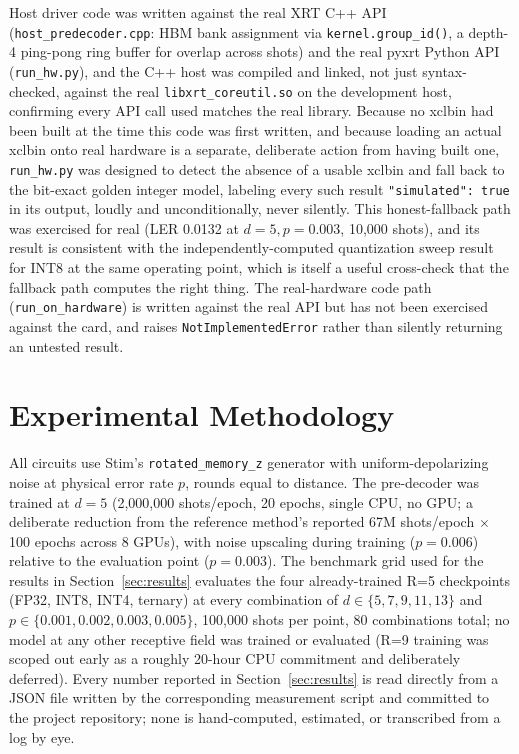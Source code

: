 \documentclass[conference]{IEEEtran}
\begin{document}
Host driver code was written against the real XRT C++ API (\texttt{host\_predecoder.cpp}: HBM bank assignment via \texttt{kernel.group\_id()}, a depth-4 ping-pong ring buffer for overlap across shots) and the real pyxrt Python API (\texttt{run\_hw.py}), and the C++ host was compiled and linked, not just syntax-checked, against the real \texttt{libxrt\_coreutil.so} on the development host, confirming every API call used matches the real library. Because no xclbin had been built at the time this code was first written, and because loading an actual xclbin onto real hardware is a separate, deliberate action from having built one, \texttt{run\_hw.py} was designed to detect the absence of a usable xclbin and fall back to the bit-exact golden integer model, labeling every such result \texttt{"simulated": true} in its output, loudly and unconditionally, never silently. This honest-fallback path was exercised for real (LER 0.0132 at \(d=5, p=0.003\), 10{,}000 shots), and its result is consistent with the independently-computed quantization sweep result for INT8 at the same operating point, which is itself a useful cross-check that the fallback path computes the right thing. The real-hardware code path (\texttt{run\_on\_hardware}) is written against the real API but has not been exercised against the card, and raises \texttt{NotImplementedError} rather than silently returning an untested result.

\section{Experimental Methodology}
\label{sec:methodology}

All circuits use Stim's \texttt{rotated\_memory\_z} generator with uniform-depolarizing noise at physical error rate \(p\), rounds equal to distance. The pre-decoder was trained at \(d=5\) (2{,}000{,}000 shots/epoch, 20 epochs, single CPU, no GPU; a deliberate reduction from the reference method's reported 67M shots/epoch $\times$ 100 epochs across 8 GPUs), with noise upscaling during training (\(p=0.006\)) relative to the evaluation point (\(p=0.003\)). The benchmark grid used for the results in Section~\ref{sec:results} evaluates the four already-trained R=5 checkpoints (FP32, INT8, INT4, ternary) at every combination of \(d \in \{5,7,9,11,13\}\) and \(p \in \{0.001, 0.002, 0.003, 0.005\}\), 100{,}000 shots per point, 80 combinations total; no model at any other receptive field was trained or evaluated (R=9 training was scoped out early as a roughly 20-hour CPU commitment and deliberately deferred). Every number reported in Section~\ref{sec:results} is read directly from a JSON file written by the corresponding measurement script and committed to the project repository; none is hand-computed, estimated, or transcribed from a log by eye.
\end{document}
